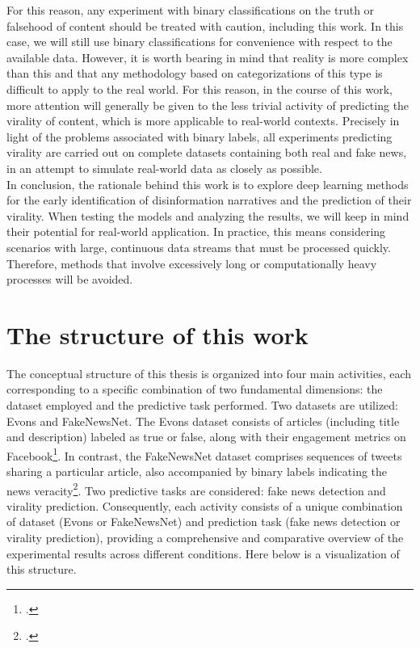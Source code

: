 \documentclass[a4paper,twoside,12pt]{book}
\begin{document}
	For this reason, any experiment with binary classifications on the truth or falsehood of content should be treated with caution, including this work. In this case, we will still use binary classifications for convenience with respect to the available data. However, it is worth bearing in mind that reality is more complex than this and that any methodology based on categorizations of this type is difficult to apply to the real world. For this reason, in the course of this work, more attention will generally be given to the less trivial activity of predicting the virality of content, which is more applicable to real-world contexts. Precisely in light of the problems associated with binary labels, all experiments predicting virality are carried out on complete datasets containing both real and fake news, in an attempt to simulate real-world data as closely as possible.\\
	
	In conclusion, the rationale behind this work is to explore deep learning methods for the early identification of disinformation narratives and the prediction of their virality. When testing the models and analyzing the results, we will keep in mind their potential for real-world application. In practice, this means considering scenarios with large, continuous data streams that must be processed quickly. Therefore, methods that involve excessively long or computationally heavy processes will be avoided.\label{rationale}
	
	\section*{The structure of this work}
	
	The conceptual structure of this thesis is organized into four main activities, each corresponding to a specific combination of two fundamental dimensions: the dataset employed and the predictive task performed. Two datasets are utilized: Evons and FakeNewsNet. The Evons dataset consists of articles (including title and description) labeled as true or false, along with their engagement metrics on Facebook\footcite{krstovski2022}. In contrast, the FakeNewsNet dataset comprises sequences of tweets sharing a particular article, also accompanied by binary labels indicating the news veracity\footcite{shu2020}. Two predictive tasks are considered: fake news detection and virality prediction. Consequently, each activity consists of a unique combination of dataset (Evons or FakeNewsNet) and prediction task (fake news detection or virality prediction), providing a comprehensive and comparative overview of the experimental results across different conditions. Here below is a visualization of this structure.
	
\end{document}
